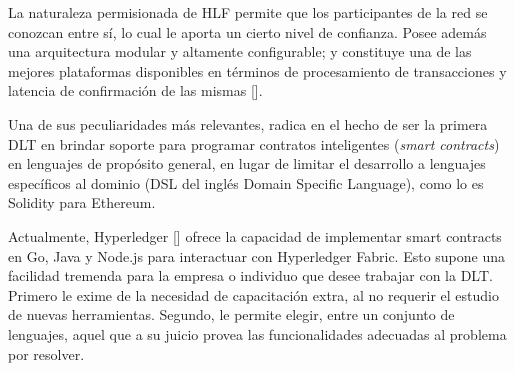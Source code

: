 La naturaleza permisionada de HLF permite que los participantes de la red se conozcan entre s\'i, lo cual le aporta un cierto nivel de confianza.
Posee adem\'as una arquitectura modular y altamente configurable; y constituye una de las mejores plataformas disponibles en t\'erminos de procesamiento de transacciones y latencia de confirmaci\'on de las mismas [\cite{hlfdocs}]. %

Una de sus peculiaridades m\'as relevantes, radica en el hecho de ser la primera DLT en brindar soporte para programar contratos inteligentes (\emph{smart contracts}) en lenguajes de prop\'osito general, en lugar de limitar el desarrollo a lenguajes espec\'ificos al dominio (DSL del ingl\'es Domain Specific Language), como lo es Solidity para Ethereum. %


Actualmente, Hyperledger [\cite{hyperledgerorg}] ofrece la capacidad de implementar smart contracts en Go, Java y Node.js para interactuar con Hyperledger Fabric. Esto supone una facilidad tremenda para la empresa o individuo que desee trabajar con la DLT. Primero le exime de la necesidad de capacitaci\'on extra, al no requerir el estudio de nuevas herramientas. Segundo, le permite elegir, entre un conjunto de lenguajes, aquel que a su juicio provea las funcionalidades adecuadas al problema por resolver.%


